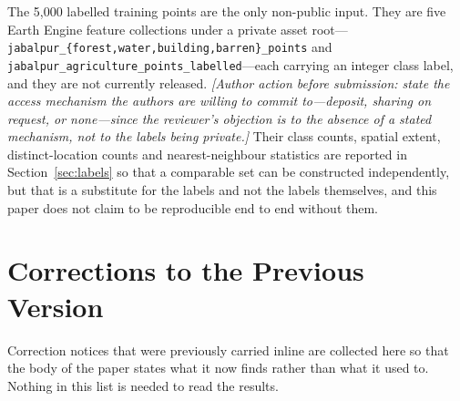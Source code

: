 \documentclass[conference]{IEEEtran}
\begin{document}
The 5,000 labelled training points are the only non-public input. They are five Earth Engine feature collections under a private asset root---\texttt{jabalpur\_\{forest,water,building,barren\}\_points} and \texttt{jabalpur\_agriculture\_points\_labelled}---each carrying an integer class label, and they are not currently released. \emph{[Author action before submission: state the access mechanism the authors are willing to commit to---deposit, sharing on request, or none---since the reviewer's objection is to the absence of a stated mechanism, not to the labels being private.]} Their class counts, spatial extent, distinct-location counts and nearest-neighbour statistics are reported in Section~\ref{sec:labels} so that a comparable set can be constructed independently, but that is a substitute for the labels and not the labels themselves, and this paper does not claim to be reproducible end to end without them.

\section*{Corrections to the Previous Version}
Correction notices that were previously carried inline are collected here so that the body of the paper states what it now finds rather than what it used to. Nothing in this list is needed to read the results.
\end{document}
